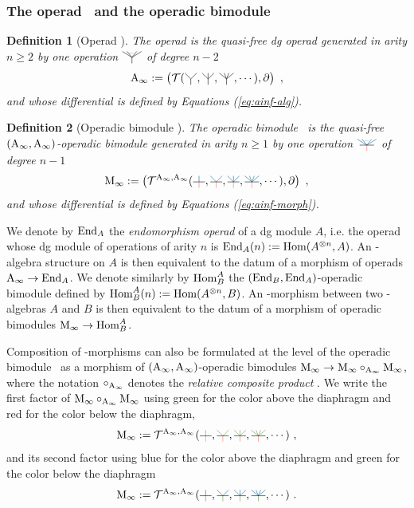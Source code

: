 \documentclass[10pt]{amsart}
\newtheorem{definition}{Definition}[section]
\theoremstyle{remark}
\begin{document}
\subsubsection{The operad \Ainf\ and the operadic bimodule \Minf} \label{sss:operad-ainf-operadic-bimod-minf}

\begin{definition}[Operad \Ainf]
The \emph{operad \Ainf} is the quasi-free dg operad generated in arity $n \geq 2$ by one operation $\arbreop{0.15}$ of degree $n-2$ 
\[ \Ainf := \left( \mathcal{T}( \arbreopdeux , \arbreoptrois, \arbreopquatre , \cdots ) , \partial \right) \ , \]
and whose differential is defined by Equations (\ref{eq:ainf-alg}).
\end{definition}

\begin{definition}[Operadic bimodule \Minf]
The operadic bimodule \Minf\ is the quasi-free $(\mathrm{A}_\infty ,\mathrm{A}_\infty )$-operadic bimodule generated in arity $n \geq 1$ by one operation $\arbreopmorph{0.15}$ of degree $n-1$ 
\[ \Minf :=  \left( \mathcal{T}^{\Ainf , \Ainf}(\arbreopunmorph , \arbreopdeuxmorph , \arbreoptroismorph , \arbreopquatremorph , \cdots ) , \partial \right) \ , \]
and whose differential is defined by Equations (\ref{eq:ainf-morph}).
\end{definition}

We denote by $\mathrm{End}_A$ the \textit{endomorphism operad} of a dg module $A$, i.e. the operad whose dg module of operations of arity $n$ is $\mathrm{End}_A(n) := \mathrm{Hom} (A^{\otimes n},A)$. 
An \Ainf -algebra structure on $A$ is then equivalent to the datum of a morphism of operads $\mathrm{A}_\infty \rightarrow \mathrm{End}_A$. 
We denote similarly by $\mathrm{Hom}^A_B$ the $(\mathrm{End}_B , \mathrm{End}_A)$-operadic bimodule defined by $ \mathrm{Hom}^A_B(n) := \mathrm{Hom} (A^{\otimes n},B)$. 
An \Ainf -morphism between two \Ainf -algebras $A$ and $B$ is then equivalent to the datum of a morphism of operadic bimodules $\mathrm{M}_\infty \rightarrow \mathrm{Hom}^A_B$.

Composition of \Ainf -morphisms can also be formulated at the level of the operadic bimodule \Minf\ as a morphism of $(\mathrm{A}_\infty , \mathrm{A}_\infty)$-operadic bimodules $\mathrm{M}_\infty \rightarrow \mathrm{M}_\infty \circ_{\mathrm{A}_\infty} \mathrm{M}_\infty$, where the notation $\circ_{\mathrm{A}_\infty}$ denotes the \emph{relative composite product} \cite[Section 11.2.1]{LodayVallette12}.
We write the first factor of $\mathrm{M}_\infty \circ_{\mathrm{A}_\infty} \mathrm{M}_\infty$ using green for the color above the diaphragm and red for the color below the diaphragm,
\[ \Minf :=  \mathcal{T}^{\Ainf , \Ainf}(\arbreopunmorphcompdeux , \arbreopdeuxmorphcompdeux , \arbreoptroismorphcompdeux , \arbreopquatremorphcompdeux , \cdots ) \ , \]
and its second factor using blue for the color above the diaphragm and green for the color below the diaphragm
\[ \Minf :=  \mathcal{T}^{\Ainf , \Ainf}(\arbreopunmorphcompun , \arbreopdeuxmorphcompun , \arbreoptroismorphcompun , \arbreopquatremorphcompun , \cdots ) \ . \]
\end{document}
